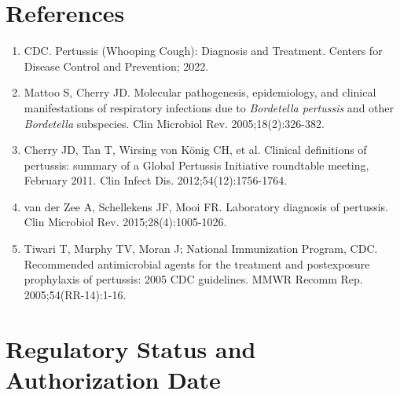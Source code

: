 \section*{References}
\begin{enumerate}
  \item CDC. Pertussis (Whooping Cough): Diagnosis and Treatment. Centers for Disease Control and Prevention; 2022.
  \item Mattoo S, Cherry JD. Molecular pathogenesis, epidemiology, and clinical manifestations of respiratory infections due to \textit{Bordetella pertussis} and other \textit{Bordetella} subspecies. Clin Microbiol Rev. 2005;18(2):326-382.
  \item Cherry JD, Tan T, Wirsing von König CH, et al. Clinical definitions of pertussis: summary of a Global Pertussis Initiative roundtable meeting, February 2011. Clin Infect Dis. 2012;54(12):1756-1764.
  \item van der Zee A, Schellekens JF, Mooi FR. Laboratory diagnosis of pertussis. Clin Microbiol Rev. 2015;28(4):1005-1026.
  \item Tiwari T, Murphy TV, Moran J; National Immunization Program, CDC. Recommended antimicrobial agents for the treatment and postexposure prophylaxis of pertussis: 2005 CDC guidelines. MMWR Recomm Rep. 2005;54(RR-14):1-16.
\end{enumerate}

\clearpage
\section*{Regulatory Status and Authorization Date}

\clearpage
